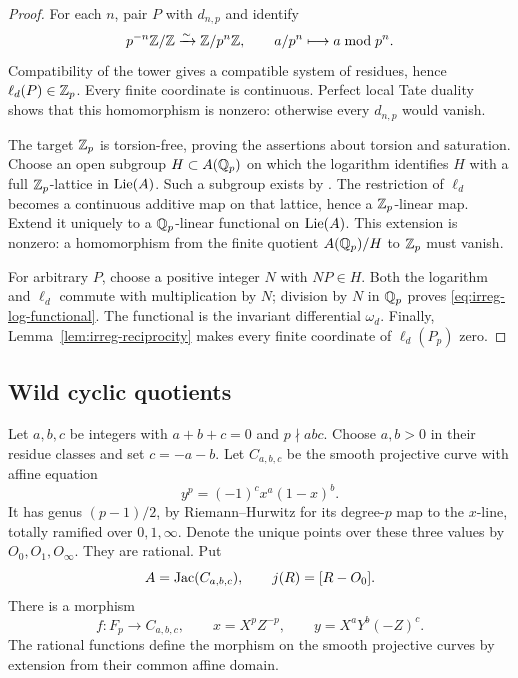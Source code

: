 \begin{proof}
For each \(n\), pair \(P\) with \(d_{n,p}\) and identify
\[
 p^{-n}\mathbb Z/\mathbb Z\xrightarrow{\sim}\mathbb Z/p^n\mathbb Z,
 \qquad a/p^n\longmapsto a\bmod p^n.
\]
Compatibility of the tower gives a compatible system of residues,
hence \(\ell_d(P)\in\mathbb Z_p\). Every finite coordinate is continuous.
Perfect local Tate duality shows that this homomorphism is nonzero:
otherwise every \(d_{n,p}\) would vanish.

The target \(\mathbb Z_p\) is torsion-free, proving the assertions about
torsion and saturation. Choose an open subgroup \(H\subset A(\mathbb Q_p)\)
on which the logarithm identifies \(H\) with a full
\(\mathbb Z_p\)-lattice in \(\operatorname{Lie}(A)\). Such a subgroup exists by
\cite[I, Lemma 3.3, p.~41]{Milne2006ADT}.
The restriction of \(\ell_d\) becomes a continuous additive map on
that lattice, hence a \(\mathbb Z_p\)-linear map. Extend it uniquely to a
\(\mathbb Q_p\)-linear functional on \(\operatorname{Lie}(A)\).
This extension is nonzero: a homomorphism from the finite quotient
\(A(\mathbb Q_p)/H\) to \(\mathbb Z_p\) must vanish.

For arbitrary \(P\), choose a positive integer \(N\) with \(NP\in H\).
Both the logarithm and \(\ell_d\) commute with multiplication by
\(N\); division by \(N\) in \(\mathbb Q_p\) proves
\eqref{eq:irreg-log-functional}. The functional is the invariant
differential \(\omega_d\). Finally,
Lemma~\ref{lem:irreg-reciprocity} makes every finite coordinate of
\(\ell_d(P_p)\) zero.
\end{proof}

\subsection{Wild cyclic quotients}
\label{sec:irreg-wild}

Let \(a,b,c\) be integers with \(a+b+c=0\) and
\(p\nmid abc\). Choose \(a,b>0\) in their residue classes and set
\(c=-a-b\). Let \(C_{a,b,c}\) be the smooth projective curve with
affine equation
\begin{equation}
 y^p=(-1)^c x^a(1-x)^b.
 \label{eq:irreg-cyclic}
\end{equation}
It has genus \((p-1)/2\), by Riemann--Hurwitz for its degree-\(p\)
map to the \(x\)-line, totally ramified over \(0,1,\infty\).
Denote the unique points over these three values by
\(O_0,O_1,O_\infty\). They are rational. Put
\[
 A=\operatorname{Jac}(C_{a,b,c}),\qquad j(R)=[R-O_0].
\]
There is a morphism
\begin{equation}
 f:F_p\longrightarrow C_{a,b,c},\qquad
 x=X^pZ^{-p},\qquad y=X^aY^b(-Z)^c.
 \label{eq:irreg-quotient-map}
\end{equation}
The rational functions define the morphism on the smooth projective
curves by extension from their common affine domain.

